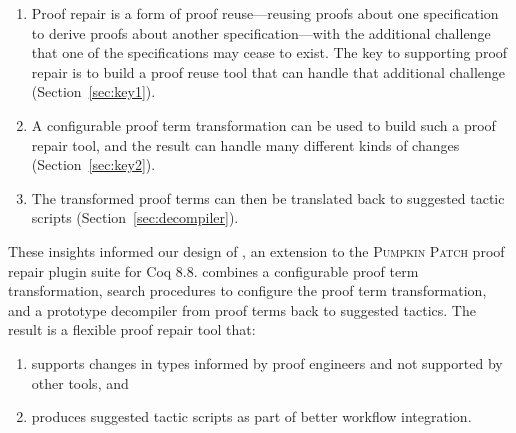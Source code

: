 \begin{enumerate}
\item Proof repair is a form of proof reuse---reusing proofs about one specification to derive proofs about another specification---with 
the additional challenge that one of the specifications may cease to exist.
The key to supporting proof repair is to build a proof reuse
tool that can handle that additional challenge (Section~\ref{sec:key1}). 
\item A configurable proof term transformation can be used to build such a proof repair tool,
and the result can handle many different kinds of changes (Section~\ref{sec:key2}).
\item The transformed proof terms can then be translated back to suggested tactic scripts (Section~\ref{sec:decompiler}).
\end{enumerate}

These insights informed our design of \toolname, an extension to the \textsc{Pumpkin Patch} proof repair plugin suite for Coq 8.8.
\toolname combines a configurable proof term transformation,
search procedures to configure the proof term transformation,
and a prototype decompiler from proof terms back to suggested tactics.
The result is a flexible proof repair tool that: 

\begin{enumerate}
\item supports changes in types informed by proof engineers and not supported by other tools, and
\item produces suggested tactic scripts as part of better workflow integration.
\end{enumerate}

